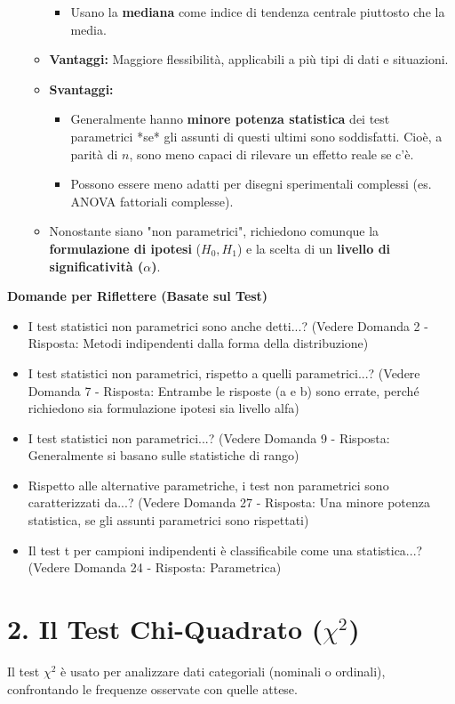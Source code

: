 \documentclass[12pt, a4paper]{article}
\newenvironment{reflectionbox}{%
    \medskip
    \begin{framed}\par\noindent
    \textbf{\color{boxtitlecolor}Domande per Riflettere (Basate sul Test)} \par
    \begin{itemize}[leftmargin=*, label=$\blacktriangleright$]
}{%
    \end{itemize}\par
    \end{framed}
    \medskip
}
\newcommand{\chisq}{\chi^2} %
\newcommand{\Hnull}{H_0} %
\newcommand{\Halt}{H_1} %
\newcommand{\alphaerr}{\alpha} %
\begin{document}
\begin{itemize}
\begin{itemize}
\begin{itemize}
                    \item Usano la \textbf{mediana} come indice di tendenza centrale piuttosto che la media.
                \end{itemize}
            \item \textbf{Vantaggi:} Maggiore flessibilità, applicabili a più tipi di dati e situazioni.
            \item \textbf{Svantaggi:}
                \begin{itemize}
                    \item Generalmente hanno \textbf{minore potenza statistica} dei test parametrici *se* gli assunti di questi ultimi sono soddisfatti. Cioè, a parità di $n$, sono meno capaci di rilevare un effetto reale se c'è.
                    \item Possono essere meno adatti per disegni sperimentali complessi (es. ANOVA fattoriali complesse).
                \end{itemize}
            \item Nonostante siano "non parametrici", richiedono comunque la \textbf{formulazione di ipotesi} ($\Hnull, \Halt$) e la scelta di un \textbf{livello di significatività ($\alphaerr$)}.
        \end{itemize}
\end{itemize}

\begin{reflectionbox}
    \item I test statistici non parametrici sono anche detti...? (Vedere Domanda 2 - Risposta: Metodi indipendenti dalla forma della distribuzione)
    \item I test statistici non parametrici, rispetto a quelli parametrici...? (Vedere Domanda 7 - Risposta: Entrambe le risposte (a e b) sono errate, perché richiedono sia formulazione ipotesi sia livello alfa)
    \item I test statistici non parametrici...? (Vedere Domanda 9 - Risposta: Generalmente si basano sulle statistiche di rango)
    \item Rispetto alle alternative parametriche, i test non parametrici sono caratterizzati da...? (Vedere Domanda 27 - Risposta: Una minore potenza statistica, se gli assunti parametrici sono rispettati)
    \item Il test t per campioni indipendenti è classificabile come una statistica...? (Vedere Domanda 24 - Risposta: Parametrica)
\end{reflectionbox}

\section*{2. Il Test Chi-Quadrato ($\chisq$)}
Il test $\chisq$ è usato per analizzare dati categoriali (nominali o ordinali), confrontando le frequenze osservate con quelle attese.
\end{document}

